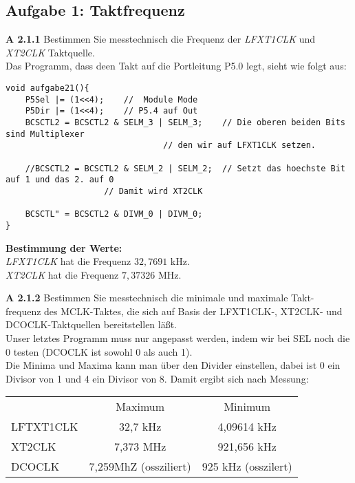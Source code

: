 \subsection*{Aufgabe 1: Taktfrequenz}

\begin{description}

\item{\bfseries A 2.1.1} Bestimmen Sie messtechnisch die Frequenz der \emph{LFXT1CLK} und  \emph{XT2CLK} Taktquelle.\\

Das Programm, dass deen Takt auf die Portleitung P5.0 legt, sieht wie folgt aus:

\begin{lstlisting}
void aufgabe21(){
	P5Sel |= (1<<4);	//  Module Mode
	P5Dir |= (1<<4);	// P5.4 auf Out
	BCSCTL2 = BCSCTL2 & SELM_3 | SELM_3;	// Die oberen beiden Bits sind Multiplexer
								// den wir auf LFXT1CLK setzen.

	//BCSCTL2 = BCSCTL2 & SELM_2 | SELM_2;	// Setzt das hoechste Bit auf 1 und das 2. auf 0
					// Damit wird XT2CLK 
	
	BCSCTL" = BCSCTL2 & DIVM_0 | DIVM_0;
}
\end{lstlisting}

\textbf{Bestimmung der Werte:}\\

\emph{LFXT1CLK} hat die Frequenz $32,7691$ kHz.\\

\emph{XT2CLK} hat die Frequenz $7,37326$ MHz.\\

\item{\bfseries A 2.1.2} Bestimmen Sie messtechnisch die minimale und maximale Takt- frequenz des MCLK-Taktes, die sich auf Basis der LFXT1CLK-, XT2CLK- und DCOCLK-Taktquellen bereitstellen läßt.\\

Unser letztes Programm muss nur angepasst werden, indem wir bei SEL noch die 0 testen (DCOCLK ist sowohl 0 als auch 1).\\

Die Minima und Maxima kann man über den Divider einstellen, dabei ist 0 ein Divisor von 1 und 4 ein Divisor von 8. Damit ergibt sich nach Messung:

\begin{center}
\begin{tabular}{lcc}
& Maximum & Minimum\\
LFTXT1CLK & 32,7 kHz & 4,09614 kHz \\
XT2CLK & 7,373 MHz & 921,656 kHz\\
DCOCLK & 7,259MhZ (ossziliert) & 925 kHz (osszilert) \\
\end{tabular}
\end{center}


\end{description}
